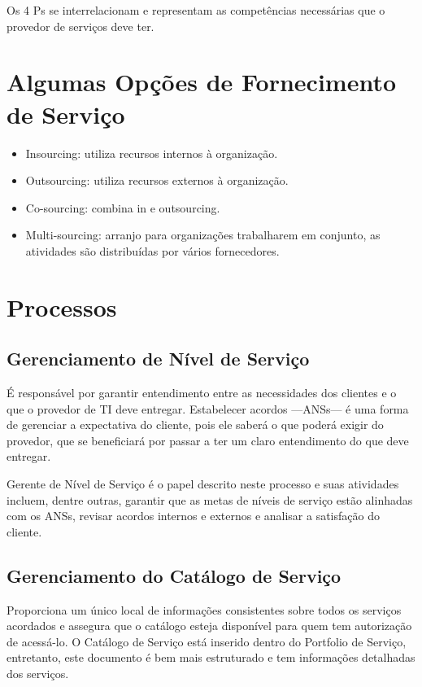 Os 4 Ps se interrelacionam e representam as competências necessárias que o
provedor de serviços deve ter.


\section{Algumas Opções de Fornecimento de Serviço}
\label{sec:design:ofs}
\begin{itemize}
    \item Insourcing: utiliza recursos internos à organização.
    \item Outsourcing: utiliza recursos externos à organização.
    \item Co-sourcing: combina in e outsourcing.
    \item Multi-sourcing: arranjo para organizações trabalharem em conjunto, as
        atividades são distribuídas por vários fornecedores.
\end{itemize}


\section{Processos}
\label{sec:design:processos}
\subsection{Gerenciamento de Nível de Serviço}
É responsável por garantir entendimento entre as necessidades dos clientes e o
que o provedor de TI deve entregar. Estabelecer acordos ---ANSs--- é uma forma
de gerenciar a expectativa do cliente, pois ele saberá o que poderá exigir do
provedor, que se beneficiará por passar a ter um claro entendimento do que deve
entregar.

Gerente de Nível de Serviço é o papel descrito neste processo e suas atividades
incluem, dentre outras, garantir que as metas de níveis de serviço estão
alinhadas com os ANSs, revisar acordos internos e externos e analisar a
satisfação do cliente.


\subsection{Gerenciamento do Catálogo de Serviço}
Proporciona um único local de informações consistentes sobre todos os serviços
acordados e assegura que o catálogo esteja disponível para quem tem autorização
de acessá-lo. O Catálogo de Serviço está inserido dentro do Portfolio de
Serviço, entretanto, este documento é bem mais estruturado e tem informações
detalhadas dos serviços.

